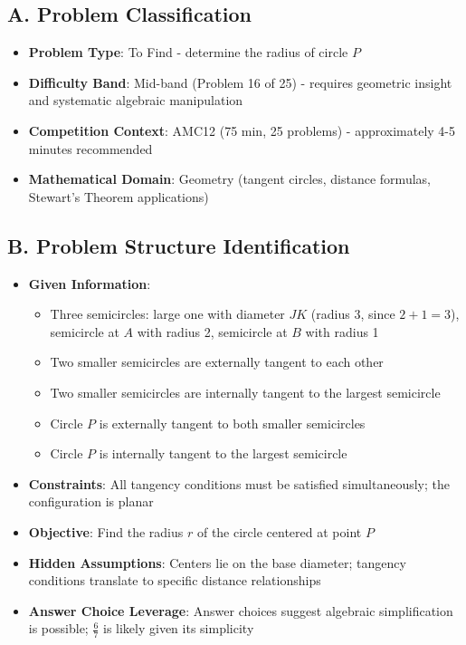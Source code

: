 \documentclass[]{article}
\begin{document}
\begin{problemconfigbox}
\subsection*{A. Problem Classification}
\begin{itemize}[leftmargin=*]
    \item \textbf{Problem Type}: To Find - determine the radius of circle $P$
    \item \textbf{Difficulty Band}: Mid-band (Problem 16 of 25) - requires geometric insight and systematic algebraic manipulation
    \item \textbf{Competition Context}: AMC12 (75 min, 25 problems) - approximately 4-5 minutes recommended
    \item \textbf{Mathematical Domain}: Geometry (tangent circles, distance formulas, Stewart's Theorem applications)
\end{itemize}

\subsection*{B. Problem Structure Identification}
\begin{itemize}[leftmargin=*]
    \item \textbf{Given Information}: 
    \begin{itemize}
        \item Three semicircles: large one with diameter $JK$ (radius 3, since $2+1=3$), semicircle at $A$ with radius 2, semicircle at $B$ with radius 1
        \item Two smaller semicircles are externally tangent to each other
        \item Two smaller semicircles are internally tangent to the largest semicircle
        \item Circle $P$ is externally tangent to both smaller semicircles
        \item Circle $P$ is internally tangent to the largest semicircle
    \end{itemize}
    \item \textbf{Constraints}: All tangency conditions must be satisfied simultaneously; the configuration is planar
    \item \textbf{Objective}: Find the radius $r$ of the circle centered at point $P$
    \item \textbf{Hidden Assumptions}: Centers lie on the base diameter; tangency conditions translate to specific distance relationships
    \item \textbf{Answer Choice Leverage}: Answer choices suggest algebraic simplification is possible; $\frac{6}{7}$ is likely given its simplicity
\end{itemize}


\end{problemconfigbox}
\end{document}
